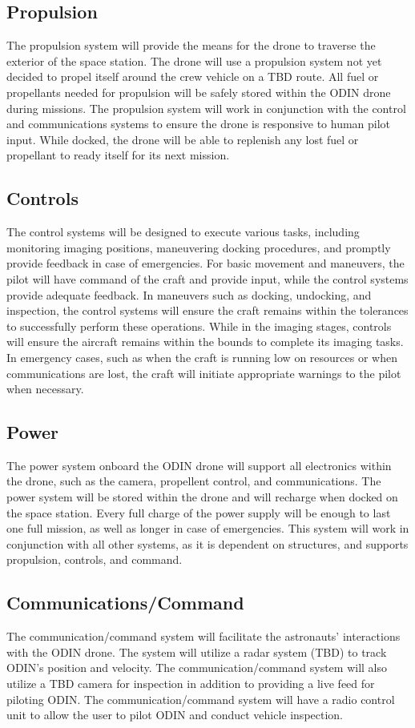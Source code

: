 \documentclass{article}
\begin{document}
\subsection{Propulsion}
The propulsion system will provide the means for the drone to traverse the exterior of the space station.  The drone will use a propulsion system not yet decided to propel itself around the crew vehicle on a TBD route. All fuel or propellants needed for propulsion will be safely stored within the ODIN drone during missions. The propulsion system will work in conjunction with the control and communications systems to ensure the drone is responsive to human pilot input. While docked, the drone will be able to replenish any lost fuel or propellant to ready itself for its next mission. 

\subsection{Controls}
The control systems will be designed to execute various tasks, including monitoring imaging positions, maneuvering docking procedures, and promptly provide feedback in case of emergencies. For basic movement and maneuvers, the pilot will have command of the craft and provide input, while the control systems provide adequate feedback. In maneuvers such as docking, undocking, and inspection, the control systems will ensure the craft remains within the tolerances to successfully perform these operations. While in the imaging stages, controls will ensure the aircraft remains within the bounds to complete its imaging tasks. In emergency cases, such as when the craft is running low on resources or when communications are lost, the craft will initiate appropriate warnings to the pilot when necessary. 

\subsection{Power}
The power system onboard the ODIN drone will support all electronics within the drone, such as the camera, propellent control, and communications. The power system will be stored within the drone and will recharge when docked on the space station. Every full charge of the power supply will be enough to last one full mission, as well as longer in case of emergencies. This system will work in conjunction with all other systems, as it is dependent on structures, and supports propulsion, controls, and command.    

\subsection{Communications/Command}
The communication/command system will facilitate the astronauts' interactions with the ODIN drone. 
The system will utilize a radar system (TBD) to track ODIN's position and velocity. 
The communication/command system will also utilize a TBD camera for inspection in addition to providing a live feed for piloting ODIN.  
The communication/command system will have a radio control unit to allow the user to pilot ODIN and conduct vehicle inspection. 
\end{document}
